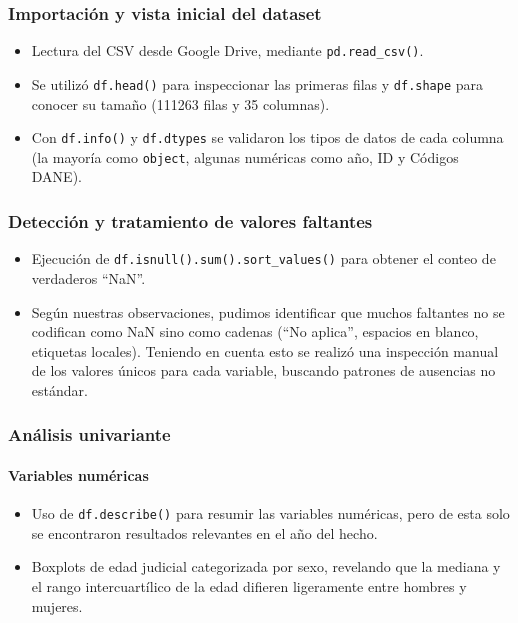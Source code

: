 \documentclass[lettersize,journal]{IEEEtran}
\begin{document}
\subsubsection{Importación y vista inicial del dataset}
\begin{itemize}
    \item Lectura del CSV desde Google Drive, mediante \texttt{pd.read\_csv()}.
    \item Se utilizó \texttt{df.head()} para inspeccionar las primeras filas y \texttt{df.shape} para conocer su tamaño (111263 filas y 35 columnas).
    \item Con \texttt{df.info()} y \texttt{df.dtypes} se validaron los tipos de datos de cada columna (la mayoría como \texttt{object}, algunas numéricas como año, ID y Códigos DANE).
\end{itemize}

\subsubsection{Detección y tratamiento de valores faltantes}
\begin{itemize}
    \item Ejecución de \texttt{df.isnull().sum().sort\_values()} para obtener el conteo de verdaderos “NaN”.
    \item Según nuestras observaciones, pudimos identificar que muchos faltantes no se codifican como NaN sino como cadenas (“No aplica”, espacios en blanco, etiquetas locales). Teniendo en cuenta esto se realizó una inspección manual de los valores únicos para cada variable, buscando patrones de ausencias no estándar.
\end{itemize}

\subsubsection{Análisis univariante}

\paragraph{Variables numéricas}
\begin{itemize}
    \item Uso de \texttt{df.describe()} para resumir las variables numéricas, pero de esta solo se encontraron resultados relevantes en el año del hecho.
    \item Boxplots de edad judicial categorizada por sexo, revelando que la mediana y el rango intercuartílico de la edad difieren ligeramente entre hombres y mujeres.
\end{itemize}
\end{document}
